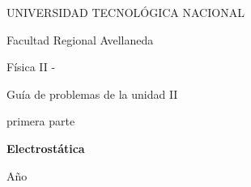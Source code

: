 \begin{titlepage}
    \begin{center}
    \vspace{1.5cm}
    

    \end{center}

    \begin{center}
        {\LARGE UNIVERSIDAD TECNOLÓGICA NACIONAL}\par\medskip
        \vspace*{0.25cm}
        {\LARGE Facultad Regional Avellaneda}\par\medskip
        \vspace*{1cm}
        {\Huge Física II - \comision}\par\medskip
        \vspace*{0.5cm}
        {\LARGE Guía de problemas de la unidad II}\par\bigskip
        {\LARGE primera parte}\par\bigskip
        \vspace*{1cm}
        {\Huge \bf \color[RGB]{0,121,138} Electrostática\par\medskip}
    \end{center}

    \vspace{1cm}

    \begin{center}
        \begin{minipage}[t]{.7\textwidth}
            \renewcommand*{\contentsname}{Contenidos}
            \tableofcontents
        \end{minipage}
        \vspace*{\fill}
    \end{center}
    \begin{center}
        Año \anio
    \end{center}

\end{titlepage}

\newpage
{}
